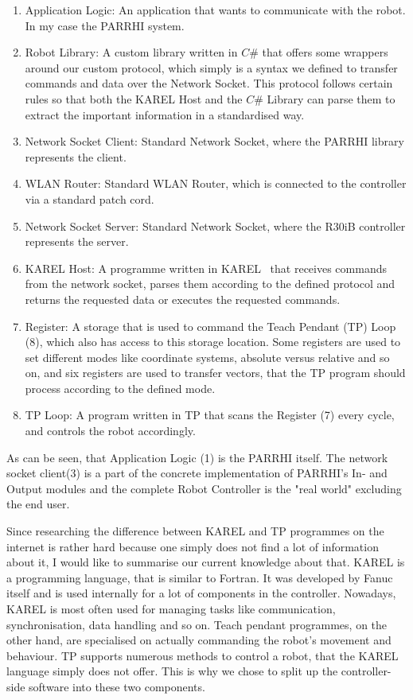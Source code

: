 \begin{enumerate}
	\item Application Logic: An application that wants to communicate with the robot. In my case the PARRHI system.
	\item Robot Library: A custom library written in $C\#$ that offers some wrappers around our custom protocol, which simply is a syntax we defined to transfer commands and data over the Network Socket. This protocol follows certain rules so that both the KAREL Host and the $C\#$ Library can parse them to extract the important information in a standardised way.
	\item Network Socket Client: Standard Network Socket, where the PARRHI library represents the client.
	\item WLAN Router: Standard WLAN Router, which is connected to the controller via a standard patch cord.
	\item Network Socket Server: Standard Network Socket, where the R30iB controller represents the server.
	\item KAREL Host: A programme written in KAREL~\cite{FanucKarel} that receives commands from the network socket, parses them according to the defined protocol and returns the requested data or executes the requested commands.
	\item Register: A storage that is used to command the Teach Pendant (TP) Loop (8), which also has access to this storage location. Some registers are used to set different modes like coordinate systems, absolute versus relative and so on, and six registers are used to transfer vectors, that the TP program should process according to the defined mode.
	\item TP Loop: A program written in TP that scans the Register (7) every cycle, and controls the robot accordingly.
\end{enumerate}

As can be seen, that Application Logic (1) is the PARRHI itself. The network socket client(3) is a part of the concrete implementation of PARRHI's In- and Output modules and the complete Robot Controller is the "real world" excluding the end user.


Since researching the difference between KAREL and TP programmes on the internet is rather hard because one simply does not find a lot of information about it, I would like to summarise our current knowledge about that. KAREL is a programming language, that is similar to Fortran. It was developed by Fanuc itself and is used internally for a lot of components in the controller. Nowadays, KAREL is most often used for managing tasks like communication, synchronisation, data handling and so on. Teach pendant programmes, on the other hand, are specialised on actually commanding the robot's movement and behaviour. TP supports numerous methods to control a robot, that the KAREL language simply does not offer. This is why we chose to split up the controller-side software into these two components.


